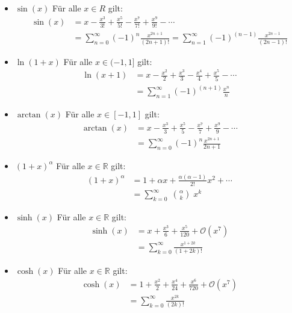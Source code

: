 \documentclass[25pt]{sciposter}
\newcommand{\R}{\mathbb{R}}
\begin{document}
\begin{multicols}{3}
\begin{itemize}
			\item $\boxed{\sin(x)}$ Für alle $x\in R$ gilt:
			\begin{align*}
				\sin(x) &=  x - \frac{x^3}{3!} + \frac{x^5}{5!} - \frac{x^7}{7!} + \frac{x^9}{9!} - \cdots\\
				&= \sum_{n=0}^{\infty} (-1)^n \frac{x^{2n+1}}{(2n+1)!} = \sum_{n=1}^{\infty} (-1)^{(n-1)} \frac{x^{2n-1}}{(2n-1)!}
			\end{align*}
			
			\item $\boxed{\ln(1+x)}$ Für alle $x\in (-1,1]$ gilt:
			\begin{align*}
				\ln(x+1) &= x - \frac{x^2}{2} + \frac{x^3}{3} - \frac{x^4}{4} + \frac{x^5}{5}- \cdots \\
				&= \sum_{n=1}^{\infty} (-1)^{(n+1)} \frac{x^n}{n}
			\end{align*}
			
			\item $\boxed{\arctan(x)}$ Für alle $x\in [-1,1]$ gilt:
			\begin{align*}
				\arctan(x) &= x - \frac{x^3}{3} + \frac{x^5}{5} - \frac{x^7}{7} + \frac{x^9}{9} - \cdots \\
				&= \sum_{n=0}^{\infty} (-1)^n \frac{x^{2n+1}}{2n+1}
			\end{align*}
			
			\item $\boxed{(1 + x)^\alpha}$ Für alle $x\in \R$ gilt:
			\begin{align*}
				(1 + x)^\alpha &=  1 + \alpha x + \frac{\alpha(\alpha-1)}{2!} x^2 + \cdots \\
				&= \sum_{k=0}^{\infty} \; {\alpha \choose k} \; x^k 
			\end{align*}
			
			\item $\boxed{\sinh(x)}$ Für alle $x\in \R$ gilt:
			\begin{align*}
				\sinh(x) &= x + \frac{x^3}{6} + \frac{x^5}{120} + \mathcal{O}(x^7)\\
				&= \sum_{k=0}^{\infty}\frac{x^{1+2k}}{(1+2k)!}
			\end{align*}
			
			\item $\boxed{\cosh(x)}$ Für alle $x\in \R$ gilt:
			\begin{align*}
				\cosh(x) &= 1 + \frac{x^2}{2} + \frac{x^4}{24} + \frac{x^6}{720} +  \mathcal{O}(x^7)\\
				&= \sum_{k=0}^{\infty}\frac{x^{2k}}{(2k)!}
			\end{align*}
			

\end{itemize}
\end{multicols}
\end{document}
